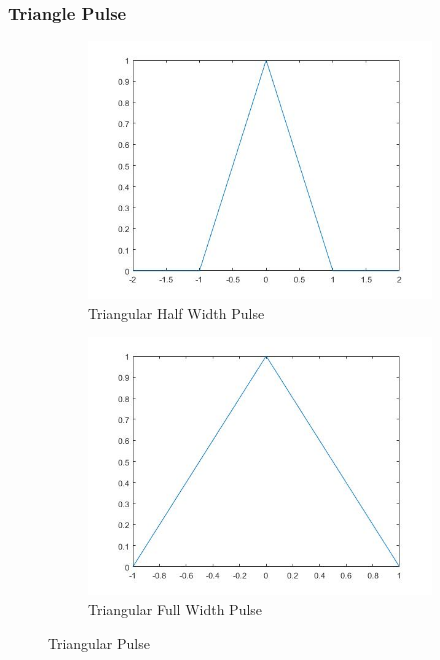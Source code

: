 \documentclass{article}
\begin{document}
\subsubsection{Triangle Pulse}
\begin{figure}[H]
  \begin{center}
    \begin{subfigure}[b]{0.4\linewidth}
      \includegraphics[width = \linewidth]{Tri_Half.jpg}
      \caption{Triangular Half Width Pulse}
    \end{subfigure}
    \begin{subfigure}[b]{0.4\linewidth}
      \includegraphics[width = \linewidth]{Tri_Full.jpg}
      \caption{Triangular Full Width Pulse}
    \end{subfigure}
    \caption{Triangular Pulse}
    \label{fig:Tri_Half}
  \end{center}
\end{figure}
\end{document}
